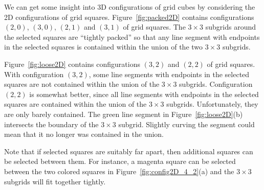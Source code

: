 We can get some insight into 3D configurations of grid cubes
by considering the 2D configurations of grid squares.
Figure~\ref{fig:packed2D} contains configurations $(2,0)$, $(3,0)$,
$(2,1)$ and $(3,1)$ of grid squares.
The $3 \times 3$ subgrids around the selected squares are ``tightly packed''
so that any line segment with endpoints in the selected squares
is contained within the union of the two $3 \times 3$ subgrids.

Figure~\ref{fig:loose2D} contains configurations $(3,2)$ and $(2,2)$
of grid squares.
With configuration $(3,2)$, some line segments with endpoints
in the selected squares are not contained within the union
of the $3 \times 3$ subgrids.
Configuration $(2,2)$ is somewhat better,
since all line segments with endpoints in the selected squares
are contained within the union of the $3 \times 3$ subgrids.
Unfortunately, they are only barely contained.
The green line segment in Figure~\ref{fig:loose2D}(b) intersects
the boundary of the $3 \times 3$ subgrid.
Slightly curving the segment could mean that it no longer was contained
in the union.

Note that if selected squares are suitably far apart,
then additional squares can be selected between them.
For instance, a magenta square can be selected between the two colored squares
in Figure~\ref{fig:config2D_4_2}(a) and the $3 \times 3$ subgrids
will fit together tightly.

